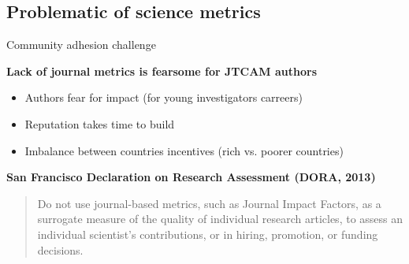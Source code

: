 \documentclass[10pt,compress,serif,aspectratio=169]{beamer}
\begin{document}
\subsection{Problematic of science metrics}
\begin{frame}[t]{Community adhesion challenge}

  \textbf{Lack of journal metrics is fearsome for JTCAM authors}
  \begin{itemize}
  \item Authors fear for impact (for young investigators carreers)
  \item Reputation takes time to build
  \item Imbalance between countries incentives (rich vs. poorer countries)
  \end{itemize}

  \vfill
  
  \textbf{San Francisco Declaration on Research Assessment (DORA, 2013)}
  \begin{quote}Do not use journal-based metrics, such as Journal Impact Factors, as a surrogate measure of the quality of individual research articles, to assess an individual scientist’s contributions, or in hiring, promotion, or funding decisions.\end{quote}

\end{frame}
\end{document}
